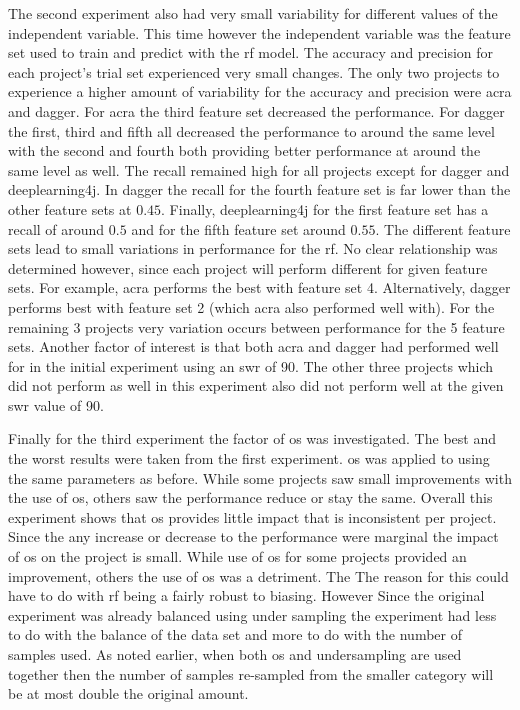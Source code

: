 The second experiment also had very small variability for different values of the independent variable. This time however the independent variable was the feature set used to train and predict with the \gls{rf} model. The accuracy and precision for each project's trial set experienced very small changes. The only two projects to experience a higher amount of variability for the accuracy and precision were acra and dagger. For acra the third feature set decreased the performance. For dagger the first, third and fifth all decreased the performance to around the same level with the second and fourth both providing better performance at around the same level as well. The recall remained high for all projects except for dagger and deeplearning4j. In dagger the recall for the fourth feature set is far lower than the other feature sets at $0.45$. Finally, deeplearning4j for the first feature set has a recall of around $0.5$ and for the fifth feature set around $0.55$. The different feature sets lead to small variations in performance for the \gls{rf}. No clear relationship was determined however, since each project will perform different for given feature sets. For example, acra performs the best with feature set 4. Alternatively, dagger performs best with feature set 2 (which acra also performed well with). For the remaining 3 projects very variation occurs between performance for the 5 feature sets. Another factor of interest is that both acra and dagger had performed well for in the initial experiment using an \gls{swr} of 90. The other three projects which did not perform as well in this experiment also did not perform well at the given \gls{swr} value of 90.

Finally for the third experiment the factor of \gls{os} was investigated. The best and the worst results were taken from the first experiment. \gls{os} was applied to using the same parameters as before. While some projects saw small improvements with the use of \gls{os}, others saw the performance reduce or stay the same. Overall this experiment shows that \gls{os} provides little impact that is inconsistent per project. Since the any increase or decrease to the performance were marginal the impact of \gls{os} on the project is small. While use of \gls{os} for some projects provided an improvement, others the use of \gls{os} was a detriment. The The reason for this could have to do with \gls{rf} being a fairly robust to biasing. However Since the original experiment was already balanced using under sampling the experiment had less to do with the balance of the data set and more to do with the number of samples used. As noted earlier, when both \gls{os} and undersampling are used together then the number of samples re-sampled from the smaller category will be at most double the original amount.


